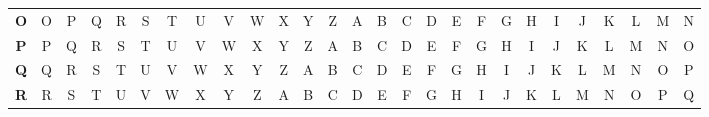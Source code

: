 \documentclass{article}
\begin{document}
\begin{latin}
\begin{table}[H]
{\begin{tabular}{ccccccccccccccccccccccccccc}
\multicolumn{1}{c|}{\textbf{O}} & \multicolumn{1}{c|}{O} & \multicolumn{1}{c|}{P} & \multicolumn{1}{c|}{Q} & \multicolumn{1}{c|}{R} & \multicolumn{1}{c|}{S} & \multicolumn{1}{c|}{T} & \multicolumn{1}{c|}{U} & \multicolumn{1}{c|}{V} & \multicolumn{1}{c|}{W} & \multicolumn{1}{c|}{X} & \multicolumn{1}{c|}{Y} & \multicolumn{1}{c|}{Z} & \multicolumn{1}{c|}{A} & \multicolumn{1}{c|}{B} & \multicolumn{1}{c|}{C} & \multicolumn{1}{c|}{D} & \multicolumn{1}{c|}{E} & \multicolumn{1}{c|}{F} & \multicolumn{1}{c|}{G} & \multicolumn{1}{c|}{H} & \multicolumn{1}{c|}{I} & \multicolumn{1}{c|}{J} & \multicolumn{1}{c|}{K} & \multicolumn{1}{c|}{L} & \multicolumn{1}{c|}{M} & \multicolumn{1}{c|}{N} \\ \cline{2-27} 
\multicolumn{1}{c|}{\textbf{P}} & \multicolumn{1}{c|}{P} & \multicolumn{1}{c|}{Q} & \multicolumn{1}{c|}{R} & \multicolumn{1}{c|}{S} & \multicolumn{1}{c|}{T} & \multicolumn{1}{c|}{U} & \multicolumn{1}{c|}{V} & \multicolumn{1}{c|}{W} & \multicolumn{1}{c|}{X} & \multicolumn{1}{c|}{Y} & \multicolumn{1}{c|}{Z} & \multicolumn{1}{c|}{A} & \multicolumn{1}{c|}{B} & \multicolumn{1}{c|}{C} & \multicolumn{1}{c|}{D} & \multicolumn{1}{c|}{E} & \multicolumn{1}{c|}{F} & \multicolumn{1}{c|}{G} & \multicolumn{1}{c|}{H} & \multicolumn{1}{c|}{I} & \multicolumn{1}{c|}{J} & \multicolumn{1}{c|}{K} & \multicolumn{1}{c|}{L} & \multicolumn{1}{c|}{M} & \multicolumn{1}{c|}{N} & \multicolumn{1}{c|}{O} \\ \cline{2-27} 
\multicolumn{1}{c|}{\textbf{Q}} & \multicolumn{1}{c|}{Q} & \multicolumn{1}{c|}{R} & \multicolumn{1}{c|}{S} & \multicolumn{1}{c|}{T} & \multicolumn{1}{c|}{U} & \multicolumn{1}{c|}{V} & \multicolumn{1}{c|}{W} & \multicolumn{1}{c|}{X} & \multicolumn{1}{c|}{Y} & \multicolumn{1}{c|}{Z} & \multicolumn{1}{c|}{A} & \multicolumn{1}{c|}{B} & \multicolumn{1}{c|}{C} & \multicolumn{1}{c|}{D} & \multicolumn{1}{c|}{E} & \multicolumn{1}{c|}{F} & \multicolumn{1}{c|}{G} & \multicolumn{1}{c|}{H} & \multicolumn{1}{c|}{I} & \multicolumn{1}{c|}{J} & \multicolumn{1}{c|}{K} & \multicolumn{1}{c|}{L} & \multicolumn{1}{c|}{M} & \multicolumn{1}{c|}{N} & \multicolumn{1}{c|}{O} & \multicolumn{1}{c|}{P} \\ \cline{2-27} 
\multicolumn{1}{c|}{\textbf{R}} & \multicolumn{1}{c|}{R} & \multicolumn{1}{c|}{S} & \multicolumn{1}{c|}{T} & \multicolumn{1}{c|}{U} & \multicolumn{1}{c|}{V} & \multicolumn{1}{c|}{W} & \multicolumn{1}{c|}{X} & \multicolumn{1}{c|}{Y} & \multicolumn{1}{c|}{Z} & \multicolumn{1}{c|}{A} & \multicolumn{1}{c|}{B} & \multicolumn{1}{c|}{C} & \multicolumn{1}{c|}{D} & \multicolumn{1}{c|}{E} & \multicolumn{1}{c|}{F} & \multicolumn{1}{c|}{G} & \multicolumn{1}{c|}{H} & \multicolumn{1}{c|}{I} & \multicolumn{1}{c|}{J} & \multicolumn{1}{c|}{K} & \multicolumn{1}{c|}{L} & \multicolumn{1}{c|}{M} & \multicolumn{1}{c|}{N} & \multicolumn{1}{c|}{O} & \multicolumn{1}{c|}{P} & \multicolumn{1}{c|}{Q} \\ \cline{2-27} 

\end{tabular}}
\end{table}
\end{latin}
\end{document}
